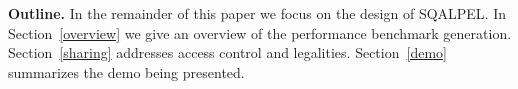 \documentclass{cidr-2019}
\begin{document}



 

{\bf Outline.} In the remainder of this paper we focus on the design of {\sc
  SQALPEL}. In Section~\ref{overview} we give an
overview of the performance benchmark generation. Section~\ref{sharing} addresses
access control and legalities. 
Section~\ref{demo} summarizes the demo being presented.
\end{document}
